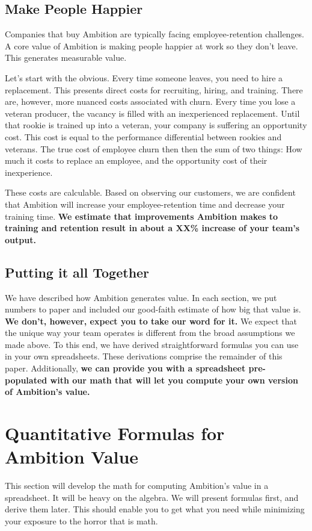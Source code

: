 \documentclass[paper=a4, fontsize=11pt abstract]{scrartcl}
\numberwithin{equation}{section}		%
\numberwithin{figure}{section}			%
\numberwithin{table}{section}				%
\begin{document}
\subsection{Make People Happier}
Companies that buy Ambition are typically facing employee-retention challenges.
A core value of Ambition is making people happier at work so they don't leave.
This generates measurable value.

Let's start with the obvious.  Every time someone leaves, you need to hire a replacement.
This presents direct costs for recruiting, hiring, and training.
There are, however, more nuanced costs associated with churn.
Every time you lose a veteran producer, the vacancy is filled with an inexperienced replacement.
Until that rookie is trained up into a veteran, your company is suffering an opportunity cost.
This cost is equal to the performance differential between rookies and veterans.
The true cost of employee churn then then the sum of two things:
How much it costs to replace an employee, and the opportunity cost of their inexperience.

These costs are calculable.
Based on observing our customers, we are confident that Ambition will increase your employee-retention time and decrease your training time.
\textbf{We estimate that improvements Ambition makes to training and retention result in about a XX\% increase of your team's output.}

\subsection{Putting it all Together}
We have described how Ambition generates value.
In each section, we put numbers to paper and included our good-faith estimate of how big that value is.
\textbf{We don't, however, expect you to take our word for it.}
We expect that the unique way your team operates is different from the broad assumptions we made above.
To this end, we have derived straightforward formulas you can use in your own spreadsheets.
These derivations comprise the remainder of this paper.
Additionally, \textbf{we can provide you with a spreadsheet pre-populated with our math that will let you compute your own version of Ambition's value.}

\section{Quantitative Formulas for Ambition Value}
This section will develop the math for computing Ambition's value in a spreadsheet.
It will be heavy on the algebra.
We will present formulas first, and derive them later.
This should enable you to get what you need while minimizing your exposure to the horror that is math.
\end{document}
